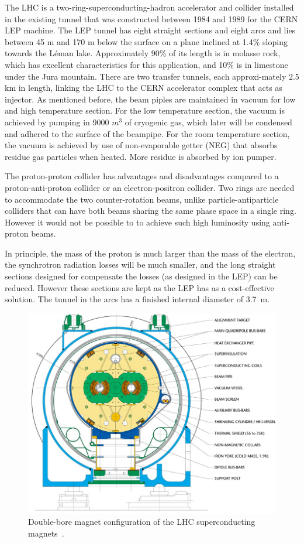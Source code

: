 	The LHC is a two-ring-superconducting-hadron accelerator and collider
	installed in the existing tunnel that was 
	constructed between 1984 and 1989 
	for the CERN LEP machine. The LEP tunnel has 
	eight straight sections and eight arcs 
	and lies between 45 m and 170 m below the 
	surface on a plane inclined at 1.4\% sloping towards the Léman lake.
	Approximately 90\% of its length is in molasse rock, 
	which has excellent characteristics for this application,
	and 10\% is in limestone under the Jura mountain. 
	There are two transfer tunnels, 
	each approxi-mately 2.5 km in length, linking the 
	LHC to the CERN accelerator complex that acts as injector.
	As mentioned before, the beam piples are maintained in 
	vacuum for low and high temperature section.
	For the low temperature section, the vacuum is achieved 
	by pumping in 9000 $m^3$ of cryogenic
	gas, which later will be condensed and adhered to the 
	surface of the beampipe. For the room temperature
	section, the vacuum is achieved by use of 
	non-evaporable getter (NEG) that absorbs residue gas particles 
	when heated. More residue is absorbed by ion pumper. 
	
	The proton-proton collider has advantages 
	and disadvantages compared to a
	proton-anti-proton collider or an electron-positron collider. 
	Two rings are needed to accommodate the two 
	counter-rotation beams, unlike particle-antiparticle 
	colliders that can have both beams sharing the same 
	phase space in a single ring.
	However it would not be possible to to 
	achieve such high luminosity using
	anti-proton beams. 
	
	In principle, the mass of the proton is much larger than 
	the mass of the electron, the
	synchrotron radiation losses will be much smaller, and 
	the long straight sections designed for
	compensate the losses (as designed in the LEP) can be reduced. 
	However these sections are kept 
	as the LEP has as a cost-effective solution. 
	The tunnel in the arcs has a finished internal diameter of 3.7~m. 
		
	\begin{figure}[bht]
		\begin{centering}	
		\includegraphics[width=.7\textwidth]{Detector_plots/LHC-double-bore-magnet.jpg}
		\caption{ Double-bore magnet configuration of the LHC 
		superconducting magnets~\cite{rossi2003lhc}.}
		\label{fig:double-bore-magnet}
		\end{centering}
	\end{figure}

